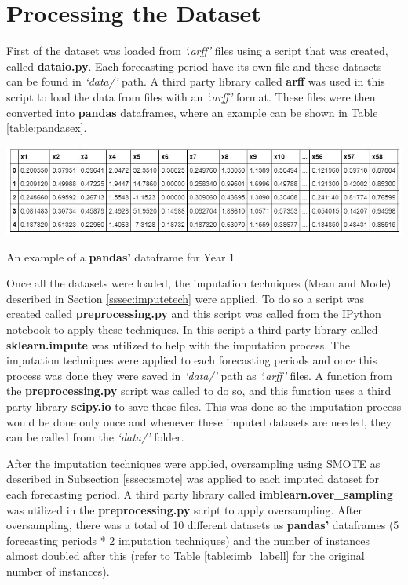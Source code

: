 \section{Processing the Dataset}\label{sec:processdataset}

First of the dataset was loaded from \textit{‘.arff’} files using a script that was created, called \textbf{dataio.py}. Each forecasting period have its own file and these datasets can be found in \textit{‘data/’} path. A third party library called \textbf{arff} \cite{python:arff} was used in this script to load the data from files with an \textit{‘.arff’} format. These files were then converted into \textbf{pandas} \cite{python:pandas} dataframes, where an example can be shown in Table \ref{table:pandasex}.

\begin{table}[H]
\centering
  \includegraphics[scale = .65]{imgs/pandas_example_year_1.JPG}
  \caption{An example of a \textbf{pandas'} dataframe for Year 1 }
  \label{table:pandasex}
\end{table}

\noindent Once all the datasets were loaded, the imputation techniques (Mean and Mode) described in Section \ref{sssec:imputetech} were applied. To do so a script was created called \textbf{preprocessing.py} and this script was called from the IPython notebook to apply these techniques. In this script a third party library called \textbf{sklearn.impute} \cite{python:sklearn_api} was utilized to help with the imputation process. The imputation techniques were applied to each forecasting periods and once this process was done they were saved in \textit{‘data/’} path as \textit{‘.arff’} files. A function from the \textbf{preprocessing.py} script was called to do so, and this function uses a third party library \textbf{scipy.io} \cite{python:scipy} to save these files. This was done so the imputation process would be done only once and whenever these imputed datasets are needed, they can be called from the \textit{‘data/’} folder.

\noindent After the imputation techniques were applied, oversampling using SMOTE as described in Subsection \ref{sssec:smote} was applied to each imputed dataset for each forecasting period. A third party library called \textbf{imblearn.over\_sampling} \cite{python:imblearn} was utilized in the \textbf{preprocessing.py} script to apply oversampling. After oversampling, there was a total of 10 different datasets as \textbf{pandas'} dataframes (5 forecasting periods * 2 imputation techniques) and the number of instances almost doubled after this (refer to Table \ref{table:imb_labell} for the original number of instances).

